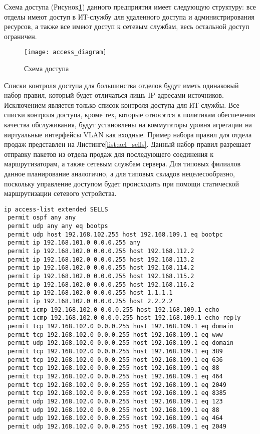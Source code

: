 \documentclass[14pt, a4paper]{extarticle}
\begin{document}
Схема доступа (Рисунок\;\ref{fig:access_diagram}) данного предприятия
имеет следующую структуру: все отделы имеют доступ в ИТ-службу для
удаленного доступа и администрирования ресурсов, а также все имеют
доступ к сетевым службам, весь остальной доступ ограничен.
\begin{figure}[H]
  \centering
  \texttt{[image: access\_diagram]}
  \caption{Схема доступа}
  \label{fig:access_diagram}
\end{figure}

Списки контроля доступа для большинства отделов будут иметь одинаковый
набор правил, который будет отличаться лишь IP-адресами
источников. Исключением является только список контроля доступа для
ИТ-службы. Все списки контроля доступа, кроме тех, которые относятся к
политикам обеспечения качества обслуживания, будут установлены на
коммутаторы уровня агрегации на виртуальные интерфейсы VLAN как
входные. Пример набора правил для отдела продаж представлен на
Листинге\;\ref{list:acl_sells}. Данный набор правил разрешает отправку
пакетов из отдела продаж для последующего соединения к
маршрутизаторам, а также сетевым службам сервера. Для типовых филиалов
данное планирование аналогично, а для типовых складов нецелесообразно,
поскольку управление доступом будет происходить при помощи статической
маршрутизации сетевого устройства.

\begin{lstlisting}[caption=Команды списков контроля доступа для отдела продаж\label{list:acl_sells}]
ip access-list extended SELLS
 permit ospf any any
 permit udp any any eq bootps
 permit udp host 192.168.102.255 host 192.168.109.1 eq bootpc
 permit ip 192.168.101.0 0.0.0.255 any
 permit ip 192.168.102.0 0.0.0.255 host 192.168.112.2
 permit ip 192.168.102.0 0.0.0.255 host 192.168.113.2
 permit ip 192.168.102.0 0.0.0.255 host 192.168.114.2
 permit ip 192.168.102.0 0.0.0.255 host 192.168.115.2
 permit ip 192.168.102.0 0.0.0.255 host 192.168.116.2
 permit ip 192.168.102.0 0.0.0.255 host 1.1.1.1
 permit ip 192.168.102.0 0.0.0.255 host 2.2.2.2
 permit icmp 192.168.102.0 0.0.0.255 host 192.168.109.1 echo
 permit icmp 192.168.102.0 0.0.0.255 host 192.168.109.1 echo-reply
 permit tcp 192.168.102.0 0.0.0.255 host 192.168.109.1 eq domain
 permit tcp 192.168.102.0 0.0.0.255 host 192.168.109.1 eq www
 permit udp 192.168.102.0 0.0.0.255 host 192.168.109.1 eq domain
 permit tcp 192.168.102.0 0.0.0.255 host 192.168.109.1 eq 389
 permit tcp 192.168.102.0 0.0.0.255 host 192.168.109.1 eq 636
 permit tcp 192.168.102.0 0.0.0.255 host 192.168.109.1 eq 88
 permit tcp 192.168.102.0 0.0.0.255 host 192.168.109.1 eq 464
 permit tcp 192.168.102.0 0.0.0.255 host 192.168.109.1 eq 2049
 permit tcp 192.168.102.0 0.0.0.255 host 192.168.109.1 eq 8385
 permit udp 192.168.102.0 0.0.0.255 host 192.168.109.1 eq 123
 permit udp 192.168.102.0 0.0.0.255 host 192.168.109.1 eq 88
 permit udp 192.168.102.0 0.0.0.255 host 192.168.109.1 eq 464
 permit udp 192.168.102.0 0.0.0.255 host 192.168.109.1 eq 2049
\end{lstlisting}
\end{document}
